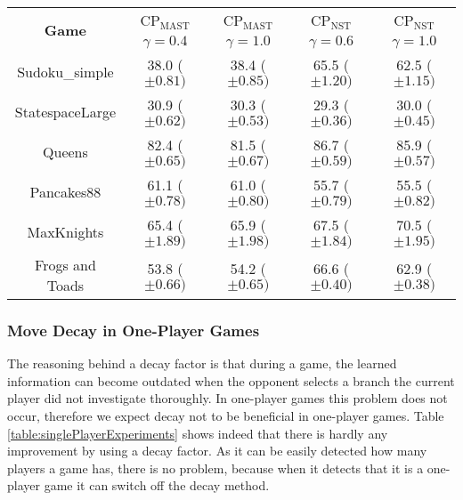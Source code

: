 \documentclass[journal]{IEEEtran}
\begin{document}
\begin{table*}[t]
\caption{Average scores of CP$_{\textrm{MAST}}$ using Move Decay with $\gamma \in \left\{ {0.4, 1.0}\right\}$ and CP$_{\textrm{NST}}$ using Move Decay with $\gamma \in \left\{ {0.6, 1.0}\right\}$, startclock$=$70s, playclock$=$40s, on go4nature01}
\label{table:singlePlayerExperiments}
\centering
\begin{tabular}{|c|c|c| |c|c|}
\hline
 \multirow{2}{*}{\textbf{Game}} & CP$_{\textrm{MAST}}$  & CP$_{\textrm{MAST}}$ & CP$_{\textrm{NST}}$ & CP$_{\textrm{NST}}$ \\
  & $\gamma=0.4$ & $\gamma=1.0$ & $\gamma=0.6$ & $\gamma=1.0$ \\
\hline\hline
Sudoku\_simple & 38.0 ($\pm 0.81)$ & 38.4 ($\pm 0.85)$ & 65.5 ($\pm 1.20)$ & 62.5 ($\pm 1.15)$\\ 
StatespaceLarge & 30.9 ($\pm 0.62)$ & 30.3 ($\pm 0.53)$ & 29.3 ($\pm 0.36)$ & 30.0 ($\pm 0.45)$\\
Queens & 82.4 ($\pm 0.65)$ & 81.5 ($\pm 0.67)$ & 86.7 ($\pm 0.59)$ & 85.9 ($\pm 0.57)$\\ 
Pancakes88 & 61.1 ($\pm 0.78)$ & 61.0 ($\pm 0.80)$ & 55.7 ($\pm 0.79)$ & 55.5 ($\pm 0.82)$\\ 
MaxKnights & 65.4 ($\pm 1.89)$ & 65.9 ($\pm 1.98)$ & 67.5 ($\pm 1.84)$ & 70.5 ($\pm 1.95)$\\ 
Frogs and Toads & 53.8 ($\pm 0.66)$ & 54.2 ($\pm 0.65)$ & 66.6 ($\pm 0.40)$ & 62.9 ($\pm 0.38)$\\ 

 \hline
\end{tabular}
\end{table*}

\subsubsection{Move Decay in One-Player Games}
The reasoning behind a decay factor is that during a game, the learned information can become outdated when the opponent selects a branch the current player did not investigate thoroughly. In one-player games this problem does not occur, therefore we expect decay not to be beneficial in one-player games. Table \ref{table:singlePlayerExperiments} shows indeed that there is hardly any improvement by using a decay factor. As it can be easily detected how many players a game has, there is no problem, because when it detects that it is a one-player game it can switch off the decay method.
\end{document}
